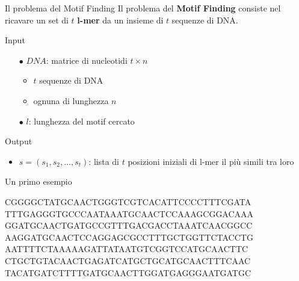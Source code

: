 	\begin{frame}{Il problema del Motif Finding}
		Il problema del \alert{\textbf{Motif Finding}} consiste nel ricavare un set di $t$ \alert{\textbf{l-mer}} da un insieme di $t$ sequenze di DNA.
		\pause
		\begin{block}{Input}
			\begin{itemize}
				\item[$\bullet$] $DNA$: matrice di nucleotidi $t \times n$
				\begin{itemize}
					\item $t$ sequenze di DNA
					\item ognuna di lunghezza $n$
				\end{itemize}
				\item[$\bullet$] $l$: lunghezza del motif cercato
			\end{itemize}
		\end{block}
		\pause
		\begin{block}{Output}
			\begin{itemize}
				\item $s=(s_1,s_2,\dots,s_t)$: lista di $t$ posizioni iniziali di l-mer il più simili tra loro
			\end{itemize}
		\end{block}
	\end{frame}
	
	\begin{frame}{Un primo esempio}
		\begin{center}
			CGGGGCT\onslide<1,2>ATGCAACT\onslide<1>GGGTCGTCACATTCCCCTTTCGATA\\
			TTTGAGGGTGCCCAATAA\onslide<1,2>ATGCAACT\onslide<1>CCAAAGCGGACAAA\\
			GG\onslide<1,2>ATGCAACT\onslide<1>GATGCCGTTTGACGACCTAAATCAACGGCC\\
			AAGG\onslide<1,2>ATGCAACT\onslide<1>CCAGGAGCGCCTTTGCTGGTTCTACCTG\\
			AATTTTCTAAAAAGATTATAATGTCGGTCC\onslide<1,2>ATGCAACT\onslide<1>TC\\
			CTGCTGTACAACTGAGATCATGCTGC\onslide<1,2>ATGCAACT\onslide<1>TTCAAC\\
			TACATGATCTTTTG\onslide<1,2>ATGCAACT\onslide<1>TGGATGAGGGAATGATGC
		\end{center}
	\end{frame}
	
